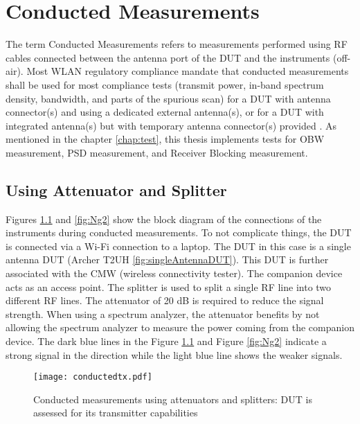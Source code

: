 \chapter{Conducted Measurements} \label{chap:5}

The term Conducted Measurements refers to measurements performed using \acs{RF} cables connected between the antenna port of the \acs{DUT} and the instruments (off-air). Most \acs{WLAN} regulatory compliance mandate that conducted measurements shall be used for most compliance tests (transmit power, in-band spectrum density, bandwidth, and parts of the spurious scan) for a \acs{DUT} with antenna connector(s) and using a dedicated external antenna(s), or for a \acs{DUT} with integrated antenna(s) but with temporary antenna connector(s) provided \cite{conducted}. As mentioned in the chapter \ref{chap:test}, this thesis implements tests for \acf{OBW} measurement, \acf{PSD} measurement, and Receiver Blocking measurement.

\section{Using Attenuator and Splitter}
\label{sec:att}
Figures \ref{fig:Ng1} and \ref{fig:Ng2} show the block diagram of the connections of the instruments during conducted measurements. To not complicate things, the \acs{DUT} is connected via a Wi-Fi\texttrademark{} connection to a laptop. The \acs{DUT} in this case is a single antenna \acs{DUT} (Archer T2UH \ref{fig:singleAntennaDUT}). This \acs{DUT} is further associated with the \ac{CMW} (wireless connectivity tester). The companion device acts as an access point. The splitter is used to split a single \acs{RF} line into two different \acs{RF} lines. The attenuator of 20 dB is required to reduce the signal strength. When using a spectrum analyzer, the attenuator benefits by not allowing the spectrum analyzer to measure the power coming from the companion device. The dark blue lines in the Figure \ref{fig:Ng1} and Figure \ref{fig:Ng2} indicate a strong signal in the direction while the light blue line shows the weaker signals. 

\begin{figure}[H]
\centering
\texttt{[image: conductedtx.pdf]}
\vspace{-1.2cm}  \caption{Conducted measurements using attenuators and splitters: \acs{DUT} is assessed for its transmitter capabilities}
 \label{fig:Ng1} 
\end{figure}

